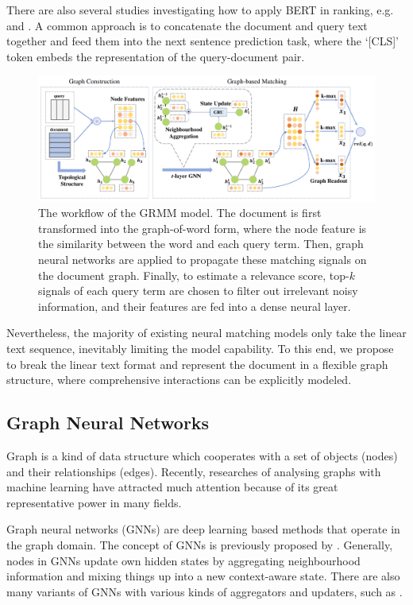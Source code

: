 There are also several studies investigating how to apply BERT in ranking, e.g.  \citet{dai2019deeper} and \citet{macavaney2019cedr}. A common approach is to concatenate the document and query text together and feed them into the next sentence prediction task, where the `[CLS]' token embeds the representation of the query-document pair. 
\begin{figure}[h]
	\centering
	\includegraphics[width=\textwidth]{./pics/grmm.pdf}
	\caption{The workflow of the GRMM model. The document is first transformed into the graph-of-word form, where the node feature is the similarity between the word and each query term. Then, graph neural networks are applied to propagate these matching signals on the document graph. Finally, to estimate a relevance score, top-$k$ signals of each query term are chosen to filter out irrelevant noisy information, and their features are fed into a dense neural layer. }
	\label{fig:2} 
\end{figure}

Nevertheless, the majority of existing neural matching models only take the linear text sequence, inevitably limiting the model capability. To this end, we propose to break the linear text format and represent the document in a flexible graph structure, where comprehensive interactions can be explicitly modeled. 



\subsection{Graph Neural Networks}
Graph is a kind of data structure which cooperates with a set of objects (nodes) and their relationships (edges). Recently, researches of analysing graphs with machine learning have attracted much attention because of its great representative power in many fields. 

Graph neural networks (GNNs) are deep learning based methods that operate in the graph domain. The concept of GNNs is previously proposed by  \cite{scarselli2008graph}. Generally, nodes in GNNs update own hidden states by aggregating neighbourhood information and mixing things up into a new context-aware state. There are also many variants of GNNs with various kinds of aggregators and updaters, such as \cite{li2016gated,kipf2017semi,hamilton2017inductive,velivckovic2018graph}. 

